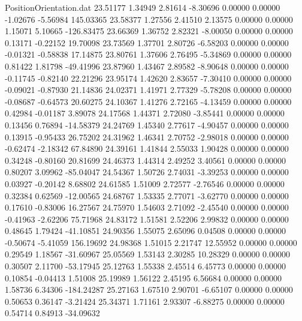 \begin{filecontents}{PositionOrientation.dat}
  23.51177    1.34949    2.81614    -8.30696    0.00000    0.00000   -1.02676   -5.56984  145.03365
  23.58377    1.27556    2.41510     2.13575    0.00000    0.00000    1.15071    5.10665 -126.83475
  23.66369    1.36752    2.82321    -8.00050    0.00000    0.00000    0.13171   -0.22152   19.70098
  23.73569    1.37701    2.80726    -6.58203    0.00000    0.00000   -0.01321   -0.58838   17.14875
  23.80761    1.37606    2.76495    -5.34869    0.00000    0.00000    0.81422    1.81798  -49.41996
  23.87960    1.43467    2.89582    -8.90648    0.00000    0.00000   -0.11745   -0.82140   22.21296
  23.95174    1.42620    2.83657    -7.30410    0.00000    0.00000   -0.09021   -0.87930   21.14836
  24.02371    1.41971    2.77329    -5.78208    0.00000    0.00000   -0.08687   -0.64573   20.60275
  24.10367    1.41276    2.72165    -4.13459    0.00000    0.00000    0.42984   -0.01187    3.89078
  24.17568    1.44371    2.72080    -3.85441    0.00000    0.00000    0.13456    0.76894  -14.58379
  24.24769    1.45340    2.77617    -4.90457    0.00000    0.00000    0.13915   -0.95433   26.75202
  24.31962    1.46341    2.70752    -2.98018    0.00000    0.00000   -0.62474   -2.18342   67.84890
  24.39161    1.41844    2.55033     1.90428    0.00000    0.00000    0.34248   -0.80160   20.81699
  24.46373    1.44314    2.49252     3.40561    0.00000    0.00000    0.80207    3.09962  -85.04047
  24.54367    1.50726    2.74031    -3.39253    0.00000    0.00000    0.03927   -0.20142    8.68802
  24.61585    1.51009    2.72577    -2.76546    0.00000    0.00000    0.32384    0.62569  -12.00565
  24.68767    1.53335    2.77071    -3.62770    0.00000    0.00000    0.17610   -0.83006   16.27567
  24.75970    1.54603    2.71092    -2.45540    0.00000    0.00000   -0.41963   -2.62206   75.71968
  24.83172    1.51581    2.52206     2.99832    0.00000    0.00000    0.48645    1.79424  -41.10851
  24.90356    1.55075    2.65096     0.04508    0.00000    0.00000   -0.50674   -5.41059  156.19692
  24.98368    1.51015    2.21747    12.55952    0.00000    0.00000    0.29549    1.18567  -31.60967
  25.05569    1.53143    2.30285    10.28329    0.00000    0.00000    0.30507    2.11700  -53.17945
  25.12763    1.55338    2.45514     6.45773    0.00000    0.00000    0.10854   -0.04413    1.51008
  25.19989    1.56122    2.45195     6.56684    0.00000    0.00000    1.58736    6.34306 -184.24287
  25.27163    1.67510    2.90701    -6.65107    0.00000    0.00000    0.50653    0.36147   -3.21424
  25.34371    1.71161    2.93307    -6.88275    0.00000    0.00000    0.54714    0.84913  -34.09632

\end{filecontents}

